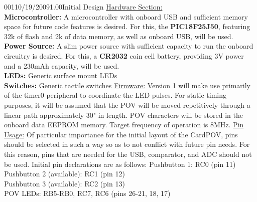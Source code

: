 \documentclass[12pt,letterpaper,onecolumn]{article}
\newcommand{\documentationtype}{Project Notebook}
\newcommand{\projectname}{CardPOV  }
\newcommand{\projectversion}{1.0  }
\begin{document}
\thispagestyle{plain}
\nbwheader{\documentationtype}{\projectname}{\projectversion}

\begin{nbentry}{001}{10/19/2009}{1.00}{Initial Design}
\underline{Hardware Section:} \\
\textbf{Microcontroller:} A microcontroller with onboard USB and sufficient memory space for future code
	features is desired. For this, the \textbf{PIC18F25J50}, featuring 32k of flash and 2k of data memory,
	as well as onboard USB, will be used. \\
\textbf{Power Source:} A slim power source with sufficient capacity to run the onboard circuitry is desired.
	For this, a \textbf{CR2032} coin cell battery, providing 3V power and a 230mAh capacity, will be used. \\
\textbf{LEDs:} Generic surface mount LEDs \\
\textbf{Switches:} Generic tactile switches
\hfill\newline\hfill\newline
\noindent\underline{Firmware:}
Version 1 will make use primarily of the timer0 peripheral to coordinate the LED pulses. For static timing
	purposes, it will be assumed that the POV will be moved repetitively through a linear path approximately
	30" in length. POV characters will be stored in the onboard data EEPROM memory. Target frequency of
	operation is 8MHz.
\hfill\newline\hfill\newline
\noindent\underline{Pin Usage:}
Of particular importance for the initial layout of the CardPOV, pins should be selected in such a way so as to
	not conflict with future pin needs. For this reason, pins that are needed for the USB, comparator, and
	ADC should not be used. Initial pin declarations are as follows:
	\hfill\newline\hfill\newline
	\noindent
	Pushbutton 1: RC0 (pin 11) \\
	Pushbutton 2 (available): RC1 (pin 12) \\
	Pushbutton 3 (available): RC2 (pin 13) \\
	POV LEDs: RB5-RB0, RC7, RC6 (pins 26-21, 18, 17)
\end{nbentry}
\end{document}
